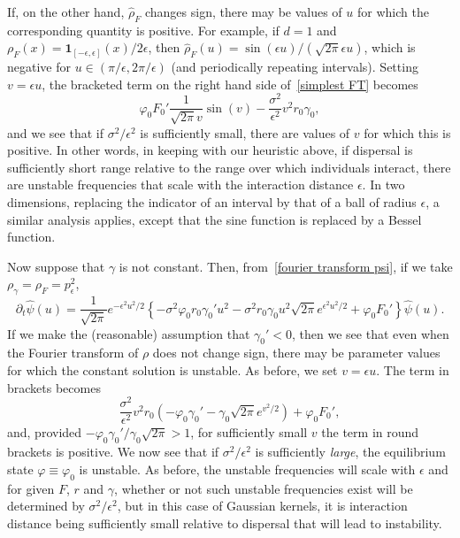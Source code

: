 \documentclass[EJP]{ejpecp} %
\renewcommand{\hat}{\widehat}
\begin{document}
If, on the other hand, $\hat{\rho}_F$ changes sign, there may be values of $u$ for which the corresponding quantity is positive. For example, if $d=1$ and
$\rho_F(x)={\mathbf 1}_{[-\epsilon, \epsilon]}(x)/2\epsilon$, then 
$\hat{\rho}_F(u)=\sin(\epsilon u)/(\sqrt{2\pi}\epsilon u)$, which is 
negative for $u\in (\pi/\epsilon, 2\pi/\epsilon)$ (and periodically 
repeating intervals). Setting $v=\epsilon u$, the bracketed term on 
the right hand side of~\eqref{simplest FT} becomes 
\[
    \varphi_0F_0'\frac{1}{\sqrt{2\pi} v} \sin(v)
	-\frac{\sigma^2}{\epsilon^2}v^2r_0\gamma_0,
\]
and we see that if $\sigma^2/\epsilon^2$ is sufficiently small, there are
values of $v$ for which this is positive. In other words, in keeping
with our heuristic above, if dispersal is sufficiently short range relative to
the range over which individuals interact, there are unstable frequencies that
scale with the interaction distance $\epsilon$. In two dimensions, replacing 
the indicator of an interval by that of a ball of radius $\epsilon$, a
similar analysis applies, except that the sine function is replaced by a 
Bessel function.

Now suppose that $\gamma$ is not constant. Then, 
from~\eqref{fourier transform psi},
if we take 
$\rho_\gamma=\rho_F=p_\epsilon^2$,
\begin{equation*}
	\partial_t \hat \psi(u) =
    \frac{1}{\sqrt{2\pi}}
    e^{-\epsilon^2 u^2/2} 
	\left\{
		-\sigma^2 \varphi_0 r_0 \gamma_0' u^2
        -\sigma^2 r_0 \gamma_0 u^2 \sqrt{2\pi} e^{\epsilon^2 u^2/2}
        +\varphi_0 F_0'
	\right\}
	\hat{\psi}(u).
\end{equation*}
If we make the (reasonable)
assumption that $\gamma_0'<0$, then we see that even when the Fourier
transform of $\rho$ does not change sign, there may be parameter values
for which the constant solution is unstable.
As before, we set $v=\epsilon u$. The term in brackets becomes
\[
	\frac{\sigma^2}{\epsilon^2}v^2 r_0
    \left(
        -\varphi_0 \gamma_0' - \gamma_0 \sqrt{2\pi} e^{v^2/2}
    \right) + \varphi_0F_0',
\] 
and, provided $-\varphi_0\gamma_0'/\gamma_0\sqrt{2\pi} >1$, for sufficiently small $v$ 
the term in round brackets is positive. We now see that if 
$\sigma^2/\epsilon^2$ is sufficiently {\em large},
the equilibrium state $\varphi\equiv\varphi_0$ 
is unstable. As before, the unstable frequencies will scale with $\epsilon$
and for given $F$, $r$ and $\gamma$, whether or not such unstable
frequencies exist will be determined by $\sigma^2/\epsilon^2$, but 
in this case of Gaussian kernels, 
it is interaction distance being sufficiently small relative
to dispersal that will lead to instability.
	
\end{document}
